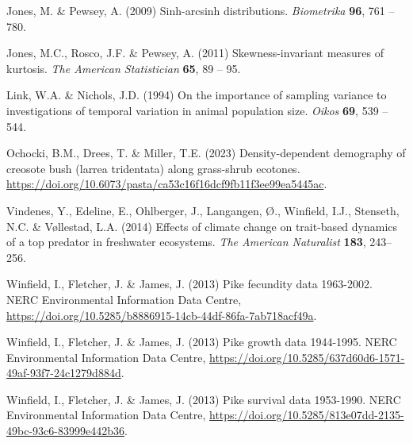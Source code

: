 \documentclass[12pt]{article}
\begin{document}
\begin{spacing}{1.35}
\begin{thebibliography}{62}
		Jones, M. \& Pewsey, A. (2009) Sinh-arcsinh distributions. \emph{Biometrika}
		\textbf{96}, 761 -- 780.
		
		Jones, M.C., Rosco, J.F. \& Pewsey, A. (2011) Skewness-invariant measures of
		kurtosis. \emph{The American Statistician} \textbf{65}, 89 -- 95.
		
		Link, W.A. \& Nichols, J.D. (1994) On the importance of sampling variance to
		investigations of temporal variation in animal population size. \emph{Oikos}
		\textbf{69}, 539 -- 544.
		
		Ochocki, B.M., Drees, T. \& Miller, T.E. (2023) Density-dependent demography of
		creosote bush (larrea tridentata) along grass-shrub ecotones.
		\url{https://doi.org/10.6073/pasta/ca53c16f16dcf9fb11f3ee99ea5445ac}.
		
		Vindenes, Y., Edeline, E., Ohlberger, J., Langangen, {\O}., Winfield, I.J.,
		Stenseth, N.C. \& V{\o}llestad, L.A. (2014) Effects of climate change on
		trait-based dynamics of a top predator in freshwater ecosystems. \emph{The
			American Naturalist} \textbf{183}, 243--256.
		
		Winfield, I., Fletcher, J. \& James, J. (2013{}) Pike fecundity
		data 1963-2002. NERC Environmental Information Data Centre,
		\url{https://doi.org/10.5285/b8886915-14cb-44df-86fa-7ab718acf49a}.
		
		Winfield, I., Fletcher, J. \& James, J. (2013{}) Pike growth data
		1944-1995. NERC Environmental Information Data Centre, \url{
			https://doi.org/10.5285/637d60d6-1571-49af-93f7-24c1279d884d}.
		
		Winfield, I., Fletcher, J. \& James, J. (2013{}) Pike survival data
		1953-1990. NERC Environmental Information Data Centre,
		\url{https://doi.org/10.5285/813e07dd-2135-49bc-93c6-83999e442b36}.
		
	\end{thebibliography}

\end{spacing} 
\end{document}
